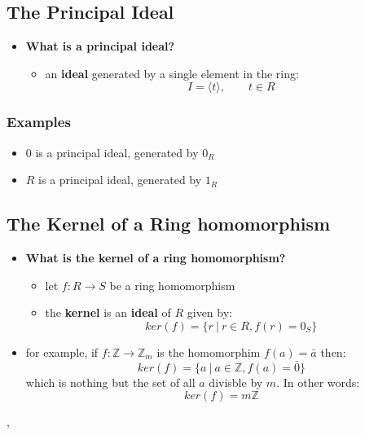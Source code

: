 \documentclass{exam}
\begin{document}
\subsection{The Principal Ideal}

\begin{itemize}
    \item \textbf{What is a principal ideal?}
    \begin{itemize}
        \item an \textbf{ideal} generated by a single element in the ring:
        \[
        I = \langle t \rangle, \qquad t \in R
        \]
    \end{itemize}
\end{itemize}

\subsubsection{Examples}

\begin{itemize}
    \item ${0}$ is a principal ideal, generated by $0_R$
    \item $R$ is a principal ideal, generated by $1_R$
\end{itemize}

\subsection{The Kernel of a Ring homomorphism}

\begin{itemize}
    \item \textbf{What is the kernel of a ring homomorphism?}
    \begin{itemize}
        \item let $f : R \to S$ be a ring homomorphism
        \item the \textbf{kernel} is an \textbf{ideal} of $R$ given by:
        \[
        ker(f) = \{r \ | \ r \in R, f(r) = 0_S\}
        \]
    \end{itemize}
    \item for example, if $f : \mathbb{Z} \to \mathbb{Z}_m$ is the homomorphim $f(a) = \bar{a}$ then:
    \[
    ker(f) = \{a \ | \ a \in \mathbb{Z}, f(a) = \bar{0}\}
    \]
    which is nothing but the set of all $a$ divisble by $m$. In other words:
    \[
    ker(f) = m\mathbb{Z}
    \]
\end{itemize}

\sep 
\end{document}
